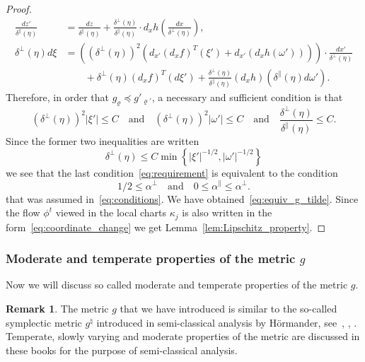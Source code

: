 \documentclass[10pt]{amsart}
\theoremstyle{definition}\newtheorem{defi}[theo]{Definition}\newtheorem{rema}[theo]{Remark}\newtheorem{exam}[theo]{Example}\newtheorem{exem}[theo]{Example}\newtheorem{nota}[theo]{Notation}
\begin{document}
\begin{proof}
\begin{align*}
\frac{dz'}{\delta^{\parallel}\left(\eta\right)} & =\frac{dz}{\delta^{\parallel}\left(\eta\right)}+\frac{\delta^{\perp}\left(\eta\right)}{\delta^{\parallel}\left(\eta\right)}\cdot d_{x}h\left(\frac{dx}{\delta^{\perp}\left(\eta\right)}\right),\\
\delta^{\perp}\left(\eta\right)d\xi & =\left((\delta^{\perp}\left(\eta\right))^{2}\left(d_{x'}\left(d_{x}f\right)^{T}(\xi')+d_{x'}\left(d_{x}h(\omega')\right)\right)\right)\cdot\frac{dx'}{\delta^{\perp}\left(\eta\right)}\\
& \qquad+\delta^{\perp}\left(\eta\right)\left(d_{x}f\right)^{T}\left(d\xi'\right)+\frac{\delta^{\perp}\left(\eta\right)}{\delta^{\parallel}\left(\eta\right)}\left(d_{x}h\right)\left(\delta^{\parallel}\left(\eta\right)d\omega'\right).
\end{align*}
Therefore, in order that $g_{\varrho}\preceq g'_{\varrho'}$, a necessary and sufficient condition is that
\begin{equation}\label{eq:requirement}
(\delta^{\perp}\left(\eta\right))^{2}\left|\xi'\right|\leq C\quad\text{and}\quad(\delta^{\perp}\left(\eta\right))^{2}\left|\omega'\right|\leq C\quad\text{and}\quad\frac{\delta^{\perp}\left(\eta\right)}{\delta^{\parallel}\left(\eta\right)}\leq C.
\end{equation}
Since the former two inequalities are written
\[
\delta^{\perp}\left(\eta\right)\leq C\min\left\{ \left|\xi'\right|^{-1/2},\left|\omega'\right|^{-1/2}\right\}
\]
we see that the last condition~\eqref{eq:requirement} is equivalent to the condition
\[
1/2\leq\alpha^{\perp}\quad\text{and}\quad0\leq\alpha^{\parallel}\leq\alpha^{\perp}.
\]
that was assumed in~\eqref{eq:conditions}. We have obtained~\eqref{eq:equiv_g_tilde}. Since the flow $\phi^{t}$ viewed in the local charts $\kappa_{j}$ is also written in the form~\eqref{eq:coordinate_change} we get Lemma~\ref{lem:Lipschitz_property}.
\end{proof}

\subsubsection{Moderate and temperate properties of the metric \texorpdfstring{$g$}{g}}

Now we will discuss so called moderate and temperate properties of the metric $g$.

\begin{rema}
The metric $g$ that we have introduced is similar to the so-called symplectic metric $g^{\natural}$ introduced in semi-classical analysis by H\"ormander, see~\cite[Defi.~2.2.19, p.~78]{lerner2011metrics}, \cite[Chap.~XVIII]{hormander_3}, \cite{nicola_rodino_livre_11}. Temperate, slowly varying and moderate properties of the metric are discussed in these books for the purpose of semi-classical analysis.
\end{rema}
\end{document}
